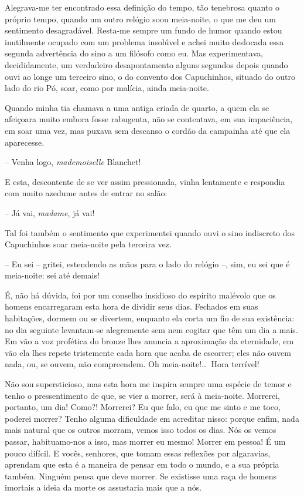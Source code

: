  Alegrava-me ter encontrado essa definição do tempo, tão tenebrosa
quanto o próprio tempo, quando um outro relógio soou meia-noite, o que
me deu um sentimento desagradável. Resta-me sempre um fundo de humor
quando estou inutilmente ocupado com um problema insolúvel e achei
muito deslocada essa segunda advertência do sino a um filósofo como eu.
Mas experimentava, decididamente, um verdadeiro desapontamento alguns
segundos depois quando ouvi ao longe um terceiro sino, o do convento
dos Capuchinhos, situado do outro lado do rio Pó, soar, como por
malícia, ainda meia-noite. 

 Quando minha tia chamava a uma antiga criada de quarto, a quem ela se
afeiçoara muito embora fosse rabugenta, não se contentava, em sua
impaciência, em soar uma vez, mas puxava sem descanso o cordão da
campainha até que ela aparecesse. 

-- Venha logo, \textit{mademoiselle} Blanchet! 

E esta, descontente de se ver assim pressionada, vinha lentamente e
respondia com muito azedume antes de entrar no salão:  

-- Já vai, \textit{madame}, já vai! 

Tal foi também o sentimento que experimentei quando ouvi o sino
indiscreto dos Capuchinhos soar meia-noite pela terceira vez. 

-- Eu sei -- gritei, estendendo as mãos para o lado do relógio --, sim, eu
sei que é meia-noite: sei até demais!

É, não há dúvida, foi por um conselho insidioso do espírito
malévolo que os homens encarregaram esta hora de dividir seus dias.
Fechados em suas habitações, dormem ou se divertem, enquanto ela corta
um fio de sua existência: no dia seguinte levantam-se alegremente sem
nem cogitar que têm um dia a mais. Em vão a voz profética do bronze                           
lhes anuncia a aproximação da eternidade, em vão ela lhes repete
tristemente cada hora que acaba de escorrer; eles não ouvem nada, ou,
se ouvem, não compreendem. Oh meia-noite!\ldots\ Hora terrível! 

Não sou supersticioso, mas esta hora me inspira sempre uma espécie de
temor e tenho o pressentimento de que, se vier a morrer, será à
meia-noite. Morrerei, portanto, um dia! Como?! Morrerei? Eu que falo, eu
que me sinto e me toco, poderei morrer? Tenho alguma dificuldade em
acreditar nisso: porque enfim, nada mais natural que os outros morram,
vemos isso todos os dias. Nós os vemos passar, habituamo-nos a isso,
mas morrer eu mesmo! Morrer em pessoa! É um pouco difícil. E vocês,
senhores, que tomam essas reflexões por algaravias, aprendam que esta é
a maneira de pensar em todo o mundo, e a sua própria também. Ninguém
pensa que deve morrer. Se existisse uma raça de homens imortais a ideia
da morte os assustaria mais que a nós.

